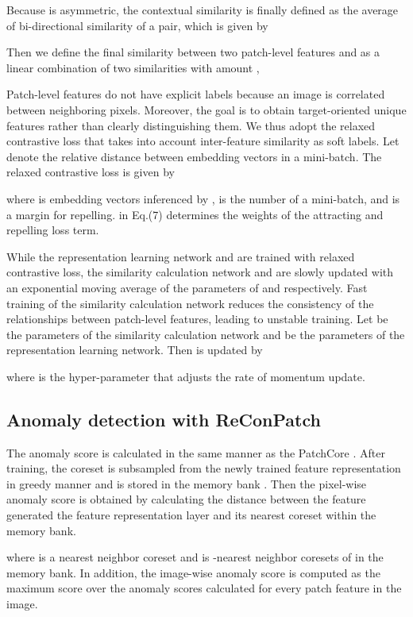 \documentclass[10pt,onecolumn,letterpaper]{article}
\begin{document}
Because  is asymmetric, the contextual similarity is finally defined as the average of bi-directional similarity of a pair, which is given by

Then we define the final similarity between two patch-level features  and  as a linear combination of two similarities with amount ,


Patch-level features do not have explicit labels because an image is correlated between neighboring pixels. Moreover, the goal is to obtain target-oriented unique features rather than clearly distinguishing them. We thus adopt the relaxed contrastive loss \cite{Kim2021embedding} that takes into account inter-feature similarity as soft labels. Let  denote the relative distance between embedding vectors in a mini-batch. The relaxed contrastive loss is given by

where  is embedding vectors inferenced by ,  is the number of a mini-batch, and  is a margin for repelling.  in Eq.(7) determines the weights of the attracting and repelling loss term.


While the representation learning network  and  are trained with relaxed contrastive loss, the similarity calculation network  and  are slowly updated with an exponential moving average of the parameters of  and  respectively. Fast training of the similarity calculation network reduces the consistency of the relationships between patch-level features, leading to unstable training. Let  be the parameters of the similarity calculation network and  be the parameters of the representation learning network. Then  is updated by

where  is the hyper-parameter that adjusts the rate of momentum update.

\subsection{Anomaly detection with ReConPatch}
The anomaly score is calculated in the same manner as the PatchCore \cite{roth2022towards}. 
After training, the coreset is subsampled from the newly trained feature representation  in greedy manner \cite{sinha2020gan} and is stored in the memory bank .
Then the pixel-wise anomaly score is obtained by calculating the distance between the feature generated the feature representation layer  and its nearest coreset  within the memory bank.


where  is a nearest neighbor coreset and  is -nearest neighbor coresets of  in the memory bank.
In addition, the image-wise anomaly score is computed as the maximum score over the anomaly scores calculated for every patch feature in the image.
\end{document}
